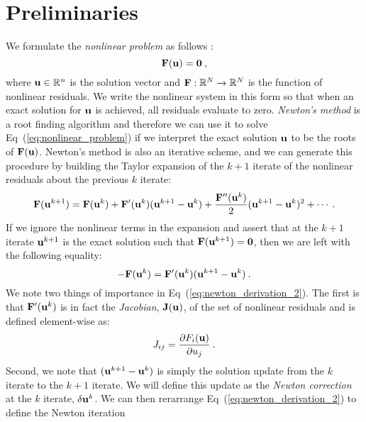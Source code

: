 \section{Preliminaries}
\label{sec:nonlinear_preliminaries}
We formulate the \textit{nonlinear problem} as follows
\citep{knoll_jacobian-free_2004}:
\begin{equation}
  \mathbf{F}(\mathbf{u}) = \mathbf{0}\:,
  \label{eq:nonlinear_problem}
\end{equation}
where $\mathbf{u} \in \mathbb{R}^n$ is the solution vector and
$\mathbf{F}:\mathbb{R}^N \rightarrow \mathbb{R}^N$ is the function of
nonlinear residuals. We write the nonlinear system in this form so
that when an exact solution for $\mathbf{u}$ is achieved, all residuals
evaluate to zero. \textit{Newton's method} is a root finding algorithm
and therefore we can use it to solve Eq~(\ref{eq:nonlinear_problem})
if we interpret the exact solution $\mathbf{u}$ to be the roots of
$\mathbf{F}(\mathbf{u})$. Newton's method is also an iterative scheme, and we
can generate this procedure by building the Taylor expansion of the
$k+1$ iterate of the nonlinear residuals about the previous $k$
iterate:
\begin{equation}
  \mathbf{F}(\mathbf{u}^{k+1}) = \mathbf{F}(\mathbf{u}^{k}) +
  \mathbf{F}'(\mathbf{u}^{k})(\mathbf{u}^{k+1}-\mathbf{u}^{k}) +
  \frac{\mathbf{F}''(\mathbf{u}^{k})}{2}(\mathbf{u}^{k+1}-\mathbf{u}^{k})^2 + \cdots
  \:.
  \label{eq:newton_derivation_1}
\end{equation}
If we ignore the nonlinear terms in the expansion and assert that at
the $k+1$ iterate $\mathbf{u}^{k+1}$ is the exact solution such that
$\mathbf{F}(\mathbf{u}^{k+1}) = \mathbf{0}$, then we are left with the following
equality:
\begin{equation}
  -\mathbf{F}(\mathbf{u}^{k}) =
  \mathbf{F}'(\mathbf{u}^{k})(\mathbf{u}^{k+1}-\mathbf{u}^{k})\:.
  \label{eq:newton_derivation_2}
\end{equation}
We note two things of importance in
Eq~(\ref{eq:newton_derivation_2}). The first is that
$\mathbf{F}'(\mathbf{u}^{k})$ is in fact the \textit{Jacobian},
$\mathbf{J}(\mathbf{u})$, of the set of nonlinear residuals and is defined
element-wise as:
\begin{equation}
  J_{ij} = \frac{\partial F_i(\mathbf{u})}{\partial u_j}\:.
  \label{eq:jacobian_def}
\end{equation}
Second, we note that $(\mathbf{u}^{k+1}-\mathbf{u}^{k})$ is simply the
solution update from the $k$ iterate to the $k+1$ iterate. We will
define this update as the \textit{Newton correction} at the $k$
iterate, $\delta \mathbf{u}^k$. We can then rerarrange
Eq~(\ref{eq:newton_derivation_2}) to define the Newton iteration
